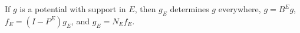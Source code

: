 If $g$ is a potential with support in $E$, then $g_E$ determines $g$ everywhere, $g = B^E g$, $f_E = (I - P^E)g_E$, and $g_E = N_E f_E$.
